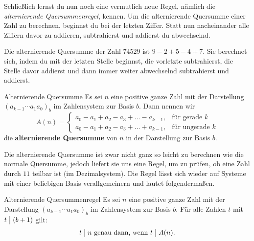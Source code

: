\documentclass[../../main.tex]{subfiles}
\begin{document}
Schließlich lernst du nun noch eine vermutlich neue Regel, nämlich die \emph{alternierende Quersummenregel}, kennen. Um
die alternierende Quersumme einer Zahl zu berechnen, beginnst du bei der letzten Ziffer. Statt nun nacheinander alle
Ziffern davor zu addieren, subtrahierst und addierst du abwechselnd.
\begin{example}{}
    Die alternierende Quersumme der Zahl $74529$ ist $9-2+5-4+7$. Sie berechnet sich, indem du mit der letzten Stelle
    beginnst, die vorletzte subtrahierst, die Stelle davor addierst und dann immer weiter abwechselnd subtrahierst und
    addierst.
\end{example}
\begin{definition}{Alternierende Quersumme}
    Es sei $n$ eine positive ganze Zahl mit der Darstellung $(a_{k-1}\cdots a_1a_0)_b$ im Zahlensystem zur Basis $b$.
    Dann nennen wir
    \[A(n)=\begin{cases}
        a_0-a_1+a_2-a_3+\dots-a_{k-1}, &\text{für gerade }k\\
        a_0-a_1+a_2-a_3+\dots+a_{k-1}, &\text{für ungerade }k
    \end{cases}\]
    die \textbf{alternierende Quersumme} von $n$ in der Darstellung zur Basis $b$.
\end{definition}
Die alternierende Quersumme ist zwar nicht ganz so leicht zu berechnen wie die normale Quersumme, jedoch liefert sie uns
eine Regel, um zu prüfen, ob eine Zahl durch $11$ teilbar ist (im Dezimalsystem). Die Regel lässt sich wieder auf
Systeme mit einer beliebigen Basis verallgemeinern und lautet folgendermaßen.
\begin{theorem}{Alternierende Quersummenregel}
    Es sei $n$ eine positive ganze Zahl mit der Darstellung $(a_{k-1}\cdots a_1a_0)_b$ im Zahlensystem zur Basis $b$.
    Für alle Zahlen $t$ mit $t\divides (b+1)$ gilt:
    \[t\divides n\text{ genau dann, wenn }t\divides A(n).\]
\end{theorem}
\end{document}
